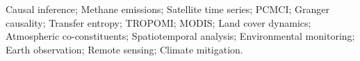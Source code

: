 \acresetall
\noindent Causal inference; Methane emissions; Satellite time series; PCMCI; Granger causality; Transfer entropy; TROPOMI; MODIS; Land cover dynamics; Atmospheric co-constituents; Spatiotemporal analysis; Environmental monitoring; Earth observation; Remote sensing; Climate mitigation.

